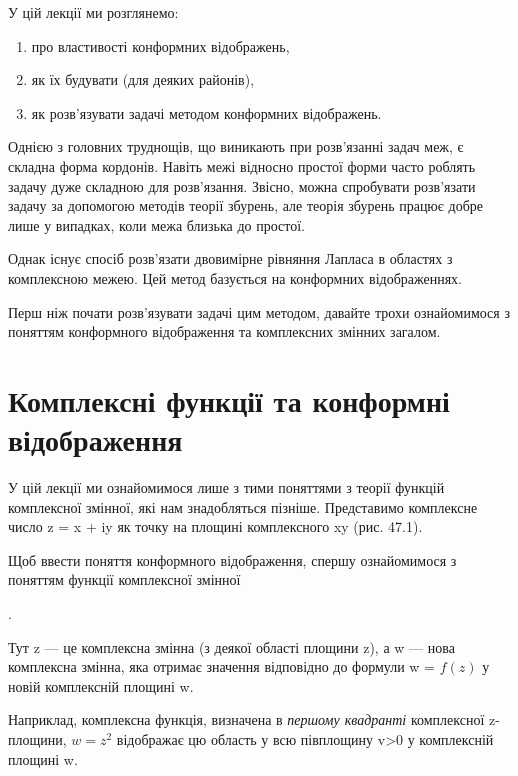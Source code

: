 \documentclass[
  ukrainian,
]{article}
\begin{document}
У цій лекції ми розглянемо:

\begin{enumerate}
\def\labelenumi{\arabic{enumi})}
\item
  про властивості конформних відображень,
\item
  як їх будувати (для деяких районів),
\item
  як розв'язувати задачі методом конформних відображень.
\end{enumerate}

Однією з головних труднощів, що виникають при розв'язанні задач меж, є
складна форма кордонів. Навіть межі відносно простої форми часто роблять
задачу дуже складною для розв'язання. Звісно, можна спробувати
розв'язати задачу за допомогою методів теорії збурень, але теорія
збурень працює добре лише у випадках, коли межа близька до простої.

Однак існує спосіб розв'язати двовимірне рівняння Лапласа в областях з
комплексною межею. Цей метод базується на конформних відображеннях.

Перш ніж почати розв'язувати задачі цим методом, давайте трохи
ознайомимося з поняттям конформного відображення та комплексних змінних
загалом.

\section{Комплексні функції та конформні
відображення}\label{ux43aux43eux43cux43fux43bux435ux43aux441ux43dux456-ux444ux443ux43dux43aux446ux456ux457-ux442ux430-ux43aux43eux43dux444ux43eux440ux43cux43dux456-ux432ux456ux434ux43eux431ux440ux430ux436ux435ux43dux43dux44f}

У цій лекції ми ознайомимося лише з тими поняттями з теорії функцій
комплексної змінної, які нам знадобляться пізніше. Представимо
комплексне число z = x + iy як точку на площині комплексного xy (рис.
47.1).

Щоб ввести поняття конформного відображення, спершу ознайомимося з
поняттям функції комплексної змінної

.

Тут z --- це комплексна змінна (з деякої області площини z), а w ---
нова комплексна змінна, яка отримає значення відповідно до формули w =
\(f(z)\) у новій комплексній площині w.

Наприклад, комплексна функція, визначена в \emph{першому квадранті}
комплексної z-площини, \(w=z^2\) відображає цю область у всю півплощину
v\textgreater0 у комплексній площині w.
\end{document}
